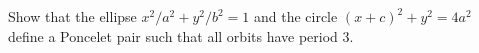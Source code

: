 
\begin{exercise}
Show that the ellipse $x^2/a^2+y^2/b^2=1$ and the circle $(x+c)^2+y^2=4a^2$ define  a Poncelet pair such that  all  orbits have   period 3.
\end{exercise}
